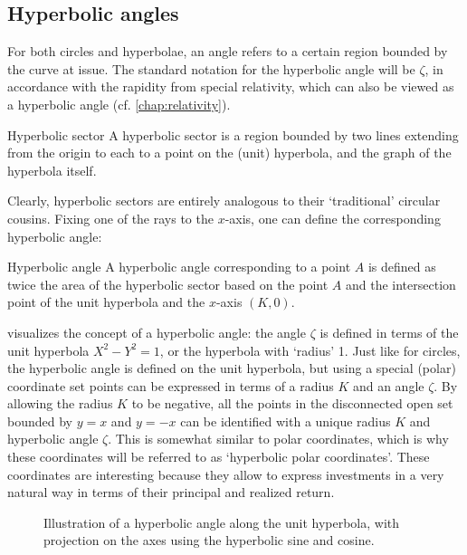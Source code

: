 \subsection{Hyperbolic angles}
For both circles and hyperbolae, an angle refers to a certain region bounded by the curve at issue. The standard notation for the hyperbolic angle will be \(\zeta\), in accordance with the rapidity from special relativity, which can also be viewed as a hyperbolic angle (cf. \cref{chap:relativity}).
\begin{thmblock}{Hyperbolic sector}
A hyperbolic sector is a region bounded by two lines extending from the origin to each to a point on the (unit) hyperbola, and the graph of the hyperbola itself. 
\end{thmblock}
Clearly, hyperbolic sectors are entirely analogous to their `traditional' circular cousins. Fixing one of the rays to the \(x\)-axis, one can define the corresponding hyperbolic angle:
\begin{thmblock}{Hyperbolic angle}
A hyperbolic angle corresponding to a point \(A\) is defined as twice the area of the hyperbolic sector based on the point \(A\) and the intersection point of the unit hyperbola and the \(x\)-axis \((K, 0)\).
\end{thmblock}
 visualizes the concept of a hyperbolic angle: the angle $\zeta$ is defined in terms of the unit hyperbola $X^2 - Y^2 = 1$, or the hyperbola with `radius' 1. 
Just like for circles, the hyperbolic angle is defined on the unit hyperbola, but using a special (polar) coordinate set points can be expressed in terms of a radius $K$ and an angle $\zeta$. By allowing the radius \(K\) to be negative, all the points in the disconnected open set bounded by \(y = x\) and \(y = -x\) can be identified with a unique radius \(K\) and hyperbolic angle \(\zeta\). This is somewhat similar to polar coordinates, which is why these coordinates will be referred to as `hyperbolic polar coordinates'. These coordinates are interesting because they allow to express investments in a very natural way in terms of their principal and realized return. 
\begin{figure}[ht!]
    \centering
    
    \caption{Illustration of a hyperbolic angle along the unit hyperbola, with projection on the axes using the hyperbolic sine and cosine.}
    \label{fig:hyperbolic_angle}
\end{figure}

